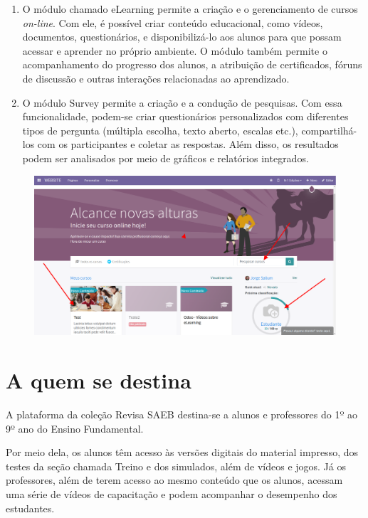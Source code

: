 \begin{enumerate}
\item O módulo chamado eLearning permite a criação e o gerenciamento de cursos \textit{on-line}. Com ele, 
é possível criar conteúdo educacional, como vídeos, documentos, questionários, e disponibilizá-lo 
aos alunos para que possam acessar e aprender no próprio ambiente. O módulo também permite o 
acompanhamento do progresso dos alunos, a atribuição de certificados, fóruns de discussão e outras 
interações relacionadas ao aprendizado.

\item O módulo Survey permite a criação e a condução de pesquisas. Com essa funcionalidade, podem-se criar 
questionários personalizados com diferentes tipos de pergunta (múltipla escolha, texto aberto, escalas etc.), 
compartilhá-los com os participantes e coletar as respostas. Além disso, os resultados podem ser analisados 
por meio de gráficos e relatórios integrados.
\end{enumerate}

\begin{figure}[t]
\includegraphics[width=\textwidth]{imgs/screenshot1}
\end{figure}


\section{A quem se destina}

A plataforma da coleção Revisa SAEB destina-se a alunos e professores do 1º ao 9º ano 
do Ensino Fundamental.

Por meio dela, os alunos têm acesso às versões digitais do material impresso, dos testes da seção 
chamada Treino e dos simulados, além de vídeos e jogos. Já os professores, além de terem acesso ao 
mesmo conteúdo que os alunos, acessam uma série de vídeos de capacitação e podem acompanhar o 
desempenho dos estudantes.

